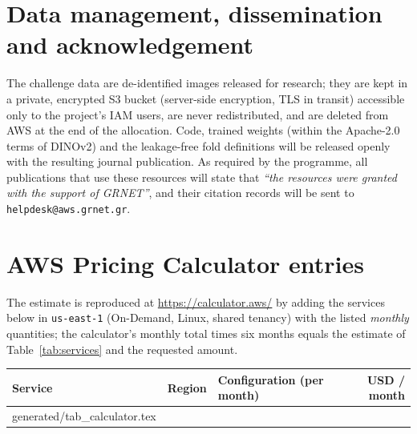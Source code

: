 \documentclass[11pt,a4paper]{article}
\makeatletter
\newcommand{\tabinput}[1]{\@@input #1 }%
\makeatother
\begin{document}
\section{Data management, dissemination and acknowledgement}

The challenge data are de-identified images released for research; they are kept in a private, encrypted S3 bucket (server-side encryption, TLS in transit) accessible only to the project's IAM users, are never redistributed, and are deleted from AWS at the end of the allocation. Code, trained weights (within the Apache-2.0 terms of DINOv2) and the leakage-free fold definitions will be released openly with the resulting journal publication. As required by the programme, all publications that use these resources will state that \emph{``the resources were granted with the support of GRNET''}, and their citation records will be sent to \texttt{helpdesk@aws.grnet.gr}.

\small


\normalsize

\appendix
\section{AWS Pricing Calculator entries}
\label{app:calc}
The estimate is reproduced at \url{https://calculator.aws/} by adding the services below in \texttt{us-east-1} (On-Demand, Linux, shared tenancy) with the listed \emph{monthly} quantities; the calculator's monthly total times six months equals the estimate of Table~\ref{tab:services} and the requested amount.

\begin{table}[H]
\centering\small
\begin{tabularx}{\textwidth}{@{}ll>{\raggedright\arraybackslash}Xr@{}}
\toprule
Service & Region & Configuration (per month) & USD / month \\
\midrule
\tabinput{generated/tab_calculator.tex}
\bottomrule
\end{tabularx}
\end{table}
\end{document}
